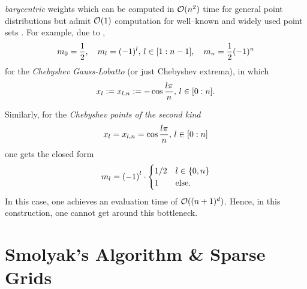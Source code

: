 \documentclass[12pt, oneside]{amsart}
\theoremstyle{definition}
\theoremstyle{remark}
\numberwithin{equation}{section}
\begin{document}
\emph{barycentric} weights which can be computed in \(\cO(n^2)\) time for 
general point distributions but admit \(\cO(1)\) computation for well--known 
and widely used point sets \cite{klimke2004}. For example, due to 
\cite{Berut_2004},
\begin{equation}\label{barycentric_weights_chebyshev}
	m_{0} = \frac{1}{2},\quad m_{l} = (-1)^l,\, l \in \indexset[1]{n-1},\quad 
	m_n = \frac{1}{2}(-1)^n
\end{equation}
for the \emph{Chebyshev Gauss-Lobatto} (or just Chebyshev extrema), in which 
\begin{equation}\label{ChebyshevGaussLobatto}
	x_l \defn x_{l,n} \defn - \cos\frac{l \pi}{n},\, l \in \indexset[0]{n}.
\end{equation}

Similarly, for the \emph{Chebyshev points of the second kind}
\begin{equation}\label{eq:chebyPts2}
	x_l = x_{l, n} = \cos \frac{l \pi}{n},\, l \in \indexset[0]{n}
\end{equation}
one gets the closed form
\begin{equation}\label{eq:weightsChebyshev}
	m_l = {\left(-1\right)}^l \cdot \begin{cases}
		1/2 &l \in \set{0, n}\\
		1 &\text{else.}
	\end{cases}
\end{equation}
In this case, one achieves an evaluation time of \(\cO((n+1)^d)\).
Hence, in this construction, one cannot get around this bottleneck. 


\section{Smolyak's Algorithm \& Sparse Grids}
\end{document}
